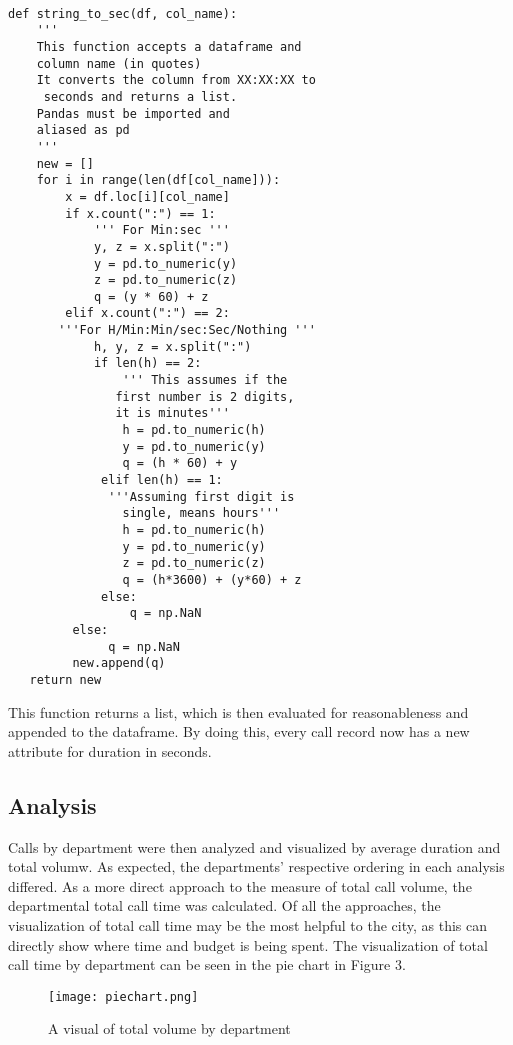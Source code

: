 \documentclass[11pt,twocolumn]{article}
\begin{document}
  \begin{Verbatim}[fontsize=\small]
  
def string_to_sec(df, col_name):
    ''' 
    This function accepts a dataframe and 
    column name (in quotes)
    It converts the column from XX:XX:XX to
     seconds and returns a list.
    Pandas must be imported and 
    aliased as pd
    '''
    new = []
    for i in range(len(df[col_name])):
        x = df.loc[i][col_name]
        if x.count(":") == 1:
            ''' For Min:sec '''
            y, z = x.split(":")
            y = pd.to_numeric(y)
            z = pd.to_numeric(z)
            q = (y * 60) + z
        elif x.count(":") == 2:
       '''For H/Min:Min/sec:Sec/Nothing '''
            h, y, z = x.split(":")
            if len(h) == 2:
                ''' This assumes if the
               first number is 2 digits,
               it is minutes'''
                h = pd.to_numeric(h)
                y = pd.to_numeric(y)
                q = (h * 60) + y
             elif len(h) == 1:
              '''Assuming first digit is 
                single, means hours'''
                h = pd.to_numeric(h)
                y = pd.to_numeric(y)
                z = pd.to_numeric(z)
                q = (h*3600) + (y*60) + z
             else:
                 q = np.NaN
         else:
              q = np.NaN
         new.append(q)
   return new
  \end{Verbatim}

This function returns a list, which is then evaluated for reasonableness and appended to the dataframe.  By doing this, every call record now has a new attribute for duration in seconds.

\subsection{Analysis}
Calls by department were then analyzed and visualized by average duration and total volumw.  As expected, the departments' respective ordering in each analysis differed.  As a more direct approach to the measure of total call volume, the departmental total call time was calculated.  Of all the approaches, the visualization of total call time may be the most helpful to the city, as this can directly show where time and budget is being spent.  The visualization of total call time by department can be seen in the pie chart in Figure 3.
\begin{figure}[h]
  \texttt{[image: piechart.png]}
  \caption{A visual of total volume by department}
 \end{figure}
 
\end{document}
